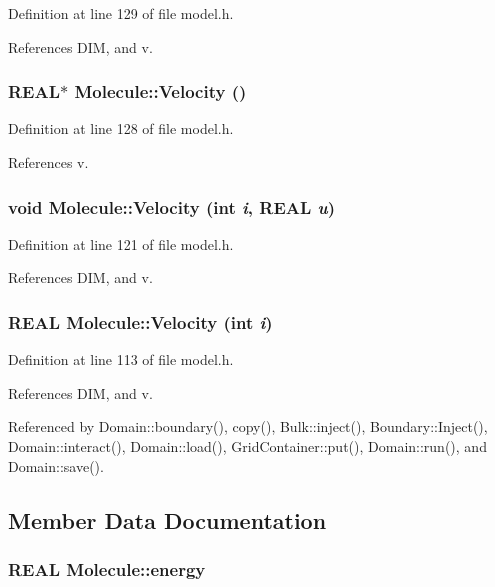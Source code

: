 Definition at line 129 of file model.h.

References DIM, and v.\hypertarget{classMolecule_6095c691e07aa1c0d6b1a51aaa95844a}{
\subsubsection[{Velocity}]{\setlength{\rightskip}{0pt plus 5cm}REAL$\ast$ Molecule::Velocity ()}}
\label{classMolecule_6095c691e07aa1c0d6b1a51aaa95844a}




Definition at line 128 of file model.h.

References v.\hypertarget{classMolecule_eb0a0b9273ac471af02a7b24700fb04d}{
\subsubsection[{Velocity}]{\setlength{\rightskip}{0pt plus 5cm}void Molecule::Velocity (int {\em i}, \/  REAL {\em u})}}
\label{classMolecule_eb0a0b9273ac471af02a7b24700fb04d}




Definition at line 121 of file model.h.

References DIM, and v.\hypertarget{classMolecule_88aa88f5770c5f0c35e05dd401ae065b}{
\subsubsection[{Velocity}]{\setlength{\rightskip}{0pt plus 5cm}REAL Molecule::Velocity (int {\em i})}}
\label{classMolecule_88aa88f5770c5f0c35e05dd401ae065b}




Definition at line 113 of file model.h.

References DIM, and v.

Referenced by Domain::boundary(), copy(), Bulk::inject(), Boundary::Inject(), Domain::interact(), Domain::load(), GridContainer::put(), Domain::run(), and Domain::save().

\subsection{Member Data Documentation}
\hypertarget{classMolecule_2057df9ea61493ef02a722f06e6fe607}{
\subsubsection[{energy}]{\setlength{\rightskip}{0pt plus 5cm}REAL {\bf Molecule::energy}}}
\label{classMolecule_2057df9ea61493ef02a722f06e6fe607}


